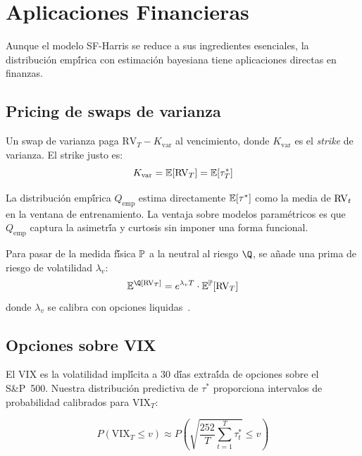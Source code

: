 
\chapter{Aplicaciones Financieras}
\label{ch:aplicaciones}

Aunque el modelo SF-Harris se reduce a sus ingredientes esenciales, la
distribuci\'{o}n emp\'{\'i}rica con estimaci\'{o}n bayesiana tiene aplicaciones
directas en finanzas.

\section{Pricing de swaps de varianza}

Un swap de varianza paga $\text{RV}_T - K_{\text{var}}$ al vencimiento, donde
$K_{\text{var}}$ es el \emph{strike} de varianza. El strike justo es:
\begin{equation}
    K_{\text{var}} = \mathbb{E}[\operatorname{RV}_T] = \mathbb{E}[\tau_T^*]
\end{equation}

La distribuci\'{o}n emp\'{\'i}rica $Q_{\text{emp}}$ estima directamente
$\mathbb{E}[\tau^*]$ como la media de $\operatorname{RV}_t$ en la ventana de entrenamiento.
La ventaja sobre modelos param\'{e}tricos es que $Q_{\text{emp}}$ captura
la asimetr\'{\'i}a y curtosis sin imponer una forma funcional.

Para pasar de la medida f\'{\'i}sica $\mathbb{P}$ a la neutral al riesgo $\Q$,
se a\~{n}ade una prima de riesgo de volatilidad $\lambda_v$:
\begin{equation}
    \E^\Q[\RV_T] = e^{\lambda_v T} \cdot \E^\Prob[\RV_T]
\end{equation}
donde $\lambda_v$ se calibra con opciones liquidas~\citep{demeterfi1999}.

\section{Opciones sobre VIX}

El VIX es la volatilidad impl\'{\'i}cita a 30 d\'{\'i}as extra\'{\'i}da de opciones
sobre el S\&P~500. Nuestra distribuci\'{o}n predictiva de $\tau^*$ proporciona
intervalos de probabilidad calibrados para $\text{VIX}_T$:

\begin{equation}
    P(\text{VIX}_T \leq v) \approx P\left(\sqrt{\frac{252}{T} \sum_{t=1}^T \tau_t^*} \leq v\right)
\end{equation}

